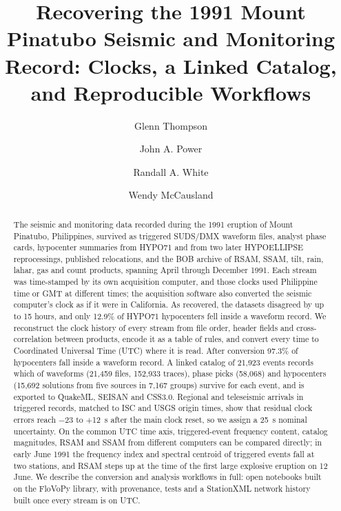 \documentclass[linenum]{SSA-SRL}
\begin{document}
\title{Recovering the 1991 Mount Pinatubo Seismic and Monitoring Record: Clocks, a Linked Catalog, and Reproducible Workflows}

\author[*1\orc{0000-0002-9173-0097}]{Glenn Thompson}
\author[2]{John A. Power}
\author[3]{Randall A. White}
\author[4]{Wendy McCausland}


\begin{abstract}
The seismic and monitoring data recorded during the 1991 eruption of Mount Pinatubo, Philippines, survived as triggered SUDS/DMX waveform files, analyst phase cards, hypocenter summaries from HYPO71 and from two later HYPOELLIPSE reprocessings, published relocations, and the BOB archive of RSAM, SSAM, tilt, rain, lahar, gas and count products, spanning April through December 1991. Each stream was time-stamped by its own acquisition computer, and those clocks used Philippine time or GMT at different times; the acquisition software also converted the seismic computer's clock as if it were in California. As recovered, the datasets disagreed by up to 15 hours, and only 12.9\% of HYPO71 hypocenters fell inside a waveform record. We reconstruct the clock history of every stream from file order, header fields and cross-correlation between products, encode it as a table of rules, and convert every time to Coordinated Universal Time (UTC) where it is read. After conversion 97.3\% of hypocenters fall inside a waveform record. A linked catalog of 21,923 events records which of waveforms (21,459 files, 152,933 traces), phase picks (58,068) and hypocenters (15,692 solutions from five sources in 7,167 groups) survive for each event, and is exported to QuakeML, SEISAN and CSS3.0. Regional and teleseismic arrivals in triggered records, matched to ISC and USGS origin times, show that residual clock errors reach $-$23 to $+$12~s after the main clock reset, so we assign a 25~s nominal uncertainty. On the common UTC time axis, triggered-event frequency content, catalog magnitudes, RSAM and SSAM from different computers can be compared directly; in early June 1991 the frequency index and spectral centroid of triggered events fall at two stations, and RSAM steps up at the time of the first large explosive eruption on 12 June. We describe the conversion and analysis workflows in full: open notebooks built on the FloVoPy library, with provenance, tests and a StationXML network history built once every stream is on UTC.
\end{abstract}
\end{document}
